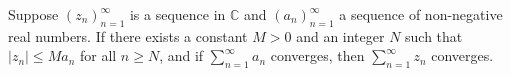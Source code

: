 Suppose $(z_n)_{n=1}^{\infty}$ is a sequence in $\mathbb{C}$ and $(a_n)_{n=1}^{\infty}$ a sequence of non-negative real numbers. If there exists a constant $M > 0$ and an integer $N$ such that $|z_n| \leq M a_n$ for all $n \geq N$, and if $\sum_{n=1}^{\infty} a_n$ converges, then $\sum_{n=1}^{\infty} z_n$ converges.
